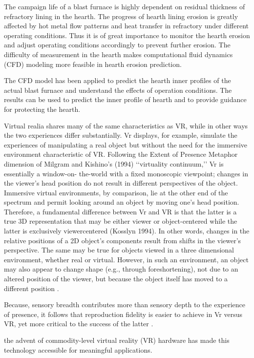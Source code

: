 The campaign life of a blast furnace is highly dependent on residual thickness of refractory lining in the hearth. The progress of hearth lining erosion is greatly affected by hot metal flow patterns and heat transfer in refractory under different operating
conditions. Thus it is of great importance to monitor the hearth erosion and adjust operating conditions accordingly to prevent further erosion. The difficulty of measurement in the hearth makes computational fluid dynamics (CFD) modeling more
feasible in hearth erosion prediction.

The CFD model has been applied to predict the hearth inner profiles of the actual blast furnace and understand the effects of operation conditions. The results can be used to predict the inner profile of hearth and to provide guidance for protecting the hearth.

Virtual realia shares many of the same characteristics as VR, while in other ways the two experiences differ substantially. Vr displays, for example, simulate the experiences of manipulating a real object but without the need for the immersive environment characteristic of VR. Following the Extent of Presence Metaphor dimension of Milgram and Kishino’s (1994) ‘‘virtuality continuum,’’ Vr is essentially a window-on- the-world with a fixed monoscopic viewpoint; changes in the viewer’s head position do not result in different perspectives of the object. Immersive virtual environments, by comparison, lie at the other end of the spectrum and permit looking around an object by moving one’s head position. Therefore, a fundamental difference between Vr and VR is that the latter is a true 3D representation that may be either viewer or object-centered while the latter is exclusively viewercentered (Kosslyn 1994). In other words, changes in the relative positions of a 2D object’s components result from shifts in the viewer’s perspective. The same may be true for objects viewed in a three dimensional environment, whether real or virtual. However, in such an environment, an object may also appear to change shape (e.g., through foreshortening), not due to an altered position of the viewer, but because the object itself has moved to a different position \citep{Kealy2006}.

Because, sensory breadth contributes more than sensory depth to the experience of presence, it follows that reproduction fidelity is easier to achieve in Vr versus VR, yet more critical to the success of the latter \citep{Kealy2006}.

 the advent of commodity-level virtual reality (VR) hardware has made this technology accessible for meaningful applications. 

